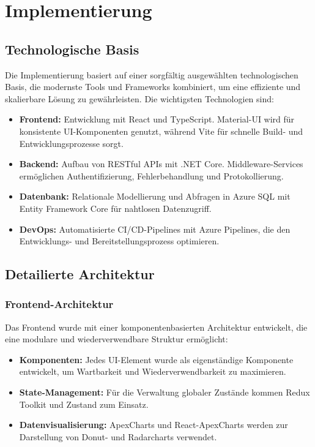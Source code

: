 \chapter{Implementierung}
\label{chap:implementierung}

\section{Technologische Basis}
Die Implementierung basiert auf einer sorgfältig ausgewählten technologischen Basis, die modernste Tools und Frameworks kombiniert, um eine effiziente und skalierbare Lösung zu gewährleisten. Die wichtigsten Technologien sind:
\begin{itemize}
    \item \textbf{Frontend:} Entwicklung mit React und TypeScript. Material-UI wird für konsistente UI-Komponenten genutzt, während Vite für schnelle Build- und Entwicklungsprozesse sorgt.
    \item \textbf{Backend:} Aufbau von RESTful APIs mit .NET Core. Middleware-Services ermöglichen Authentifizierung, Fehlerbehandlung und Protokollierung.
    \item \textbf{Datenbank:} Relationale Modellierung und Abfragen in Azure SQL mit Entity Framework Core für nahtlosen Datenzugriff.
    \item \textbf{DevOps:} Automatisierte CI/CD-Pipelines mit Azure Pipelines, die den Entwicklungs- und Bereitstellungsprozess optimieren.
\end{itemize}

\section{Detailierte Architektur}
\subsection{Frontend-Architektur}
Das Frontend wurde mit einer komponentenbasierten Architektur entwickelt, die eine modulare und wiederverwendbare Struktur ermöglicht:
\begin{itemize}
    \item \textbf{Komponenten:} Jedes UI-Element wurde als eigenständige Komponente entwickelt, um Wartbarkeit und Wiederverwendbarkeit zu maximieren.
    \item \textbf{State-Management:} Für die Verwaltung globaler Zustände kommen Redux Toolkit und Zustand zum Einsatz.
    \item \textbf{Datenvisualisierung:} ApexCharts und React-ApexCharts werden zur Darstellung von Donut- und Radarcharts verwendet.
\end{itemize}

